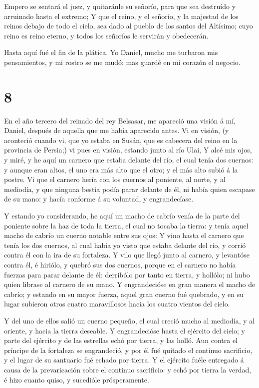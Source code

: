  Empero se sentará el juez, y quitaránle su señorío, para
que sea destruído y arruinado hasta el extremo;  Y que el
reino, y el señorío, y la majestad de los reinos debajo de todo el
cielo, sea dado al pueblo de los santos del Altísimo; cuyo reino es
reino eterno, y todos los señoríos le servirán y obedecerán.

 Hasta aquí fué el fin de la plática. Yo Daniel, mucho me
turbaron mis pensamientos, y mi rostro se me mudó: mas guardé en mi
corazón el negocio.

\hypertarget{section-7}{%
\section{8}\label{section-7}}

 En el año tercero del reinado del rey Belsasar, me apareció
una visión á mí, Daniel, después de aquella que me había aparecido
antes.  Vi en visión, (y aconteció cuando vi, que yo estaba
en Susán, que es cabecera del reino en la provincia de Persia;) vi pues
en visión, estando junto al río Ulai,  Y alcé mis ojos, y
miré, y he aquí un carnero que estaba delante del río, el cual tenía dos
cuernos: y aunque eran altos, el uno era más alto que el otro; y el más
alto subió á la postre.  Vi que el carnero hería con los
cuernos al poniente, al norte, y al mediodía, y que ninguna bestia podía
parar delante de él, ni había quien escapase de su mano: y hacía
conforme á su voluntad, y engrandecíase.

 Y estando yo considerando, he aquí un macho de cabrío venía
de la parte del poniente sobre la haz de toda la tierra, el cual no
tocaba la tierra: y tenía aquel macho de cabrío un cuerno notable entre
sus ojos:  Y vino hasta el carnero que tenía los dos
cuernos, al cual había yo visto que estaba delante del río, y corrió
contra él con la ira de su fortaleza.  Y vilo que llegó
junto al carnero, y levantóse contra él, é hiriólo, y quebró sus dos
cuernos, porque en el carnero no había fuerzas para parar delante de él:
derribólo por tanto en tierra, y hollólo; ni hubo quien librase al
carnero de su mano.  Y engrandecióse en gran manera el macho
de cabrío; y estando en su mayor fuerza, aquel gran cuerno fué quebrado,
y en su lugar subieron otros cuatro maravillosos hacia los cuatro
vientos del cielo.

 Y del uno de ellos salió un cuerno pequeño, el cual creció
mucho al mediodía, y al oriente, y hacia la tierra deseable.
 Y engrandecióse hasta el ejército del cielo; y parte del
ejército y de las estrellas echó por tierra, y las holló. 
Aun contra el príncipe de la fortaleza se engrandeció, y por él fué
quitado el continuo sacrificio, y el lugar de su santuario fué echado
por tierra.  Y el ejército fuéle entregado á causa de la
prevaricación sobre el continuo sacrificio: y echó por tierra la verdad,
é hizo cuanto quiso, y sucedióle prósperamente.

